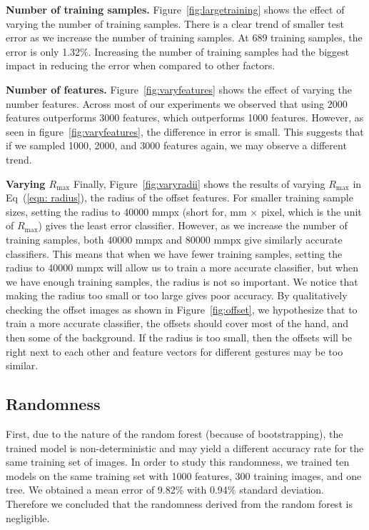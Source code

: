 \textbf{Number of training samples.} Figure~\ref{fig:largetraining} shows the effect of varying the number of training samples. There is a clear trend of smaller test error as we increase the number of training samples. At 689 training samples, the error is only 1.32\%. Increasing the number of training samples had the biggest impact in reducing the error when compared to other factors. 
\cutequation

\textbf{Number of features.} Figure~\ref{fig:varyfeatures} shows the effect of varying the number features. Across most of our experiments we observed that using 2000 features outperforms 3000 features, which outperforms 1000 features. However, as seen in figure~\ref{fig:varyfeatures}, the difference in error is small. This suggests that if we sampled 1000, 2000, and 3000 features again, we may observe a different trend.
\cutequation

\textbf{Varying $R_{\text{max}}$}
Finally, Figure~\ref{fig:varyradii} shows the results of varying $R_{\text{max}}$ in Eq~(\ref{eqn: radius}), the radius of the offset features. For smaller training sample sizes, setting the radius to 40000 mmpx (short for, mm $\times$ pixel, which is the unit of $R_{\text{max}}$) gives the least error classifier. However, as we increase the number of training samples, both 40000 mmpx and 80000 mmpx give similarly accurate classifiers. This means that when we have fewer training samples, setting the radius to 40000 mmpx  will allow us to train a more accurate classifier, but when we have enough training samples, the radius is not so important. We notice that making the radius too small or too large gives poor accuracy. By qualitatively checking the offset images as shown in Figure~\ref{fig:offset}, we hypothesize that to train a more accurate classifier, the offsets should cover most of the hand, and then some of the background. If the radius is too small, then the offsets will be right next to each other and feature vectors for different gestures may be too similar.

\cutsubsection
\subsection{ Randomness }
\cutsubsection
First, due to the nature of the random forest (because of bootstrapping), the trained model is non-deterministic and may yield a different accuracy rate for the same training set of images. In order to study this randomness, we trained ten models on the same training set with 1000 features, 300 training images, and one tree. We obtained a mean error of 9.82\% with 0.94\% standard deviation. Therefore we concluded that the randomness derived from the random forest is negligible. 

